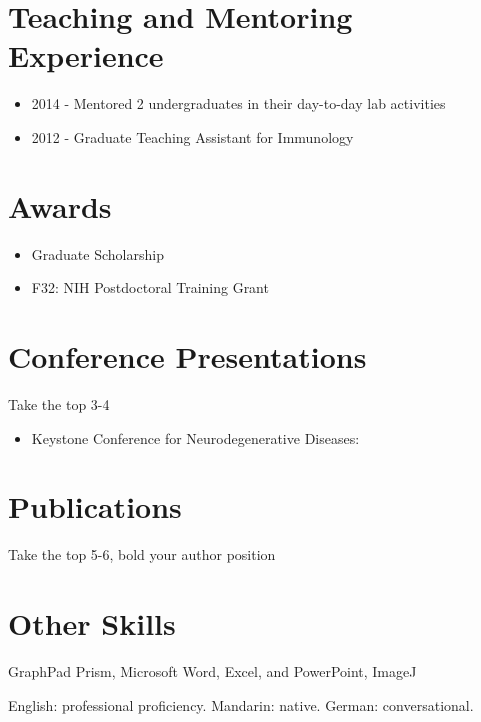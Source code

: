 \documentclass{article}
\begin{document}
\section{Teaching and Mentoring Experience }
\begin{itemize}
\item 2014 - Mentored 2 undergraduates in their day-to-day lab activities
\item 2012 - Graduate Teaching Assistant for Immunology
\end{itemize}

\section{Awards}
\begin{itemize}
\item Graduate Scholarship
\item F32: NIH Postdoctoral Training Grant
\end{itemize}

\section{Conference Presentations }

Take the top 3-4
\begin{itemize}
\item Keystone Conference for Neurodegenerative Diseases:
\end{itemize}


\section{Publications}
Take the top 5-6, bold your author position


\section{Other Skills}
\begin{description}[widest=Langauges]
\item[Software]	GraphPad Prism, Microsoft Word, Excel, and PowerPoint, ImageJ
\item[Languages]	English: professional proficiency.  Mandarin: native.  German: conversational.
\end{description}
\end{document}
